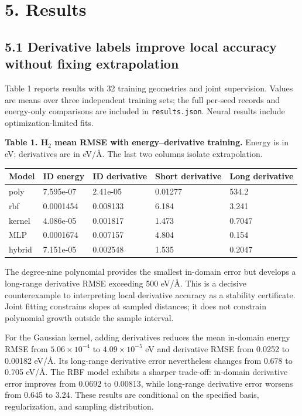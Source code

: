 \documentclass[
  11pt,
  a4paper,
]{article}
\begin{document}
\hypertarget{results}{%
\section{5. Results}\label{results}}

\hypertarget{derivative-labels-improve-local-accuracy-without-fixing-extrapolation}{%
\subsection{5.1 Derivative labels improve local accuracy without fixing
extrapolation}\label{derivative-labels-improve-local-accuracy-without-fixing-extrapolation}}

Table 1 reports results with 32 training geometries and joint
supervision. Values are means over three independent training sets; the
full per-seed records and energy-only comparisons are included in
\texttt{results.json}. Neural results include optimization-limited fits.


\textbf{Table 1. H\(_2\) mean RMSE with energy--derivative training.}
Energy is in eV; derivatives are in eV/Å. The last two columns isolate
extrapolation.

\begin{longtable}[]{@{}lllll@{}}
\toprule\noalign{}
Model & ID energy & ID derivative & Short derivative & Long
derivative \\
\midrule\noalign{}
\endhead
\bottomrule\noalign{}
\endlastfoot
poly & 7.595e-07 & 2.41e-05 & 0.01277 & 534.2 \\
rbf & 0.0001454 & 0.008133 & 6.184 & 3.241 \\
kernel & 4.086e-05 & 0.001817 & 1.473 & 0.7047 \\
MLP & 0.0001674 & 0.007157 & 4.804 & 0.154 \\
hybrid & 7.151e-05 & 0.002548 & 1.535 & 0.2047 \\
\end{longtable}

The degree-nine polynomial provides the smallest in-domain error but
develops a long-range derivative RMSE exceeding 500 eV/Å. This is a
decisive counterexample to interpreting local derivative accuracy as a
stability certificate. Joint fitting constrains slopes at sampled
distances; it does not constrain polynomial growth outside the sample
interval.

For the Gaussian kernel, adding derivatives reduces the mean in-domain
energy RMSE from \(5.06\times10^{-4}\) to \(4.09\times10^{-5}\) eV and
derivative RMSE from 0.0252 to 0.00182 eV/Å. Its long-range derivative
error nevertheless changes from 0.678 to 0.705 eV/Å. The RBF model
exhibits a sharper trade-off: in-domain derivative error improves from
0.0692 to 0.00813, while long-range derivative error worsens from 0.645
to 3.24. These results are conditional on the specified basis,
regularization, and sampling distribution.
\end{document}
